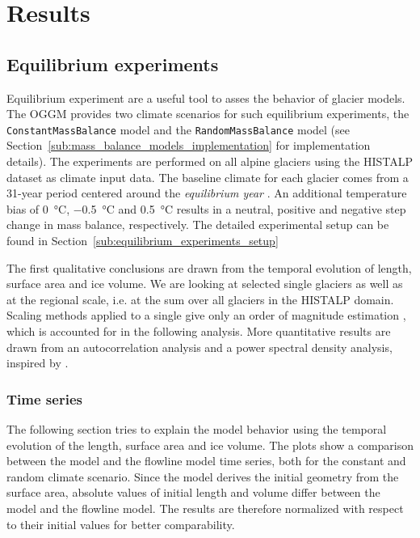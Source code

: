 \chapter{Results}\label{chap:results}
\thispagestyle{plain}

\section{Equilibrium experiments} %
\label{sec:equilibrium_experiments_results}
    Equilibrium experiment are a useful tool to asses the behavior of glacier models. The OGGM provides two climate scenarios for such equilibrium experiments, the \lstinline`ConstantMassBalance` model and the \lstinline`RandomMassBalance` model (see Section~\ref{sub:mass_balance_models_implementation} for implementation details). The experiments are performed on all alpine glaciers using the HISTALP dataset \citep{Auer2007} as climate input data. The baseline climate for each glacier comes from a 31-year period centered around the \textit{equilibrium year} \tstar. An additional temperature bias of \SI{0}{\celsius}, \SI{-0.5}{\celsius} and \SI{+0.5}{\celsius} results in a neutral, positive and negative step change in mass balance, respectively. The detailed experimental setup can be found in Section~\ref{sub:equilibrium_experiments_setup}

    The first qualitative conclusions are drawn from the temporal evolution of length, surface area and ice volume. We are looking at selected single glaciers as well as at the regional scale, i.e. at the sum over all glaciers in the HISTALP domain. Scaling methods applied to a single give only an order of magnitude estimation \citep[section 8.5][cf.]{Bahr2015}, which is accounted for in the following analysis. More quantitative results are drawn from an autocorrelation analysis and a power spectral density analysis, inspired by \citet{Roe2014}.
    
    \subsection{Time series} %
    \label{sub:time_series_results}

      The following section tries to explain the model behavior using the temporal evolution of the length, surface area and ice volume. The plots show a comparison between the \vas{} model and the flowline model time series, both for the constant and random climate scenario. Since the \vas{} model derives the initial geometry from the surface area, absolute values of initial length and volume differ between the \vas{} model and the flowline model. The results are therefore normalized with respect to their initial values for better comparability. 

